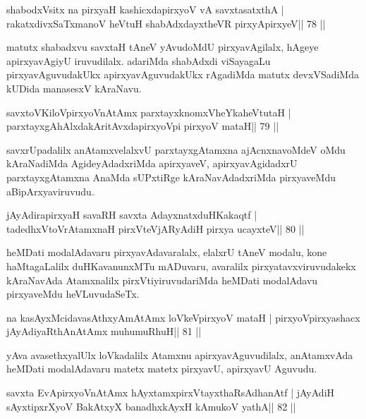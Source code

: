 \begin{shl}
shabodxV\s sitx na pirxyaH kashicxdapirxyoV vA savxtasatxthA |
rakatxdivxSaTxmanoV heVtuH shabAdxdayxtheVR pirxyApirxyeV\hfill || 78 ||
\end{shl}

\begin{artha}
matutx shabadxvu savxtaH tAneV yAvudoMdU pirxyavAgilalx, hAgeye apirxyavAgiyU iruvudilalx. adariMda shabAdxdi viSayagaLu pirxyavAguvudakUkx apirxyavAguvudakUkx rAgadiMda matutx devxVSadiMda kUDida manasesxV kAraNavu.
\end{artha}


\begin{shl}
savxtoV\s KiloV\s pirxyoV\s nAtAmx parxtayxknomxVheYkaheVtutaH |
parxtayxgAhAlxdakAritAvxdapirxyoV\s pi pirxyoV mataH\hfill || 79 ||
\end{shl}

\begin{artha}
savxrUpadalilx anAtamxvelalxvU parxtayxgAtamxna ajAcnxnavoMdeV oMdu kAraNadiMda AgideyAdadxriMda apirxyaveV, apirxyavAgidadxrU parxtayxgAtamxna AnaMda sUPxtiRge kAraNavAdadxriMda pirxyaveMdu aBipArxyaviruvudu.
\end{artha}

\begin{shl}
jAyAdirapirxyaH savaRH savxta AdayxnatxduHKakaqtf |
tadedhxVtoVrAtamxnaH pirxVteVjARyAdiH pirxya ucayxteV\hfill || 80 ||
\end{shl}

\begin{artha}
heMDati modalAdavaru pirxyavAdavaralalx, elalxrU tAneV modalu, kone haMtagaLalilx duHKavanunxMTu mADuvaru, avaralilx pirxyatavxviruvudakekx kAraNavAda Atamxnalilx pirxVtiyiruvudariMda heMDati modalAdavu pirxyaveMdu heVLuvudaSeTx.
\end{artha}

\begin{shl}
na kasAyxMcidavasAthxyAmAtAmx loVkeV\s pirxyoV mataH |
pirxyoV\s pirxyashacx jAyAdiyaRthA\s nAtAmx muhumuRhuH\hfill || 81 ||
\end{shl}

\begin{artha}
yAva avasethxyalUlx loVkadalilx Atamxnu apirxyavAguvudilalx, anAtamxvAda heMDati modalAdavaru matetx matetx pirxyavU, apirxyavU Aguvudu.
\end{artha}

\begin{shl}
savxta EvApirxyoV\s nAtAmx hAyxtamxpirxVtayxthaRsAdhanAtf |
jAyAdiH sAyxtipxrXyoV BakAtxyX banadhxkAyxH kAmukoV yathA\hfill || 82 ||
\end{shl}

